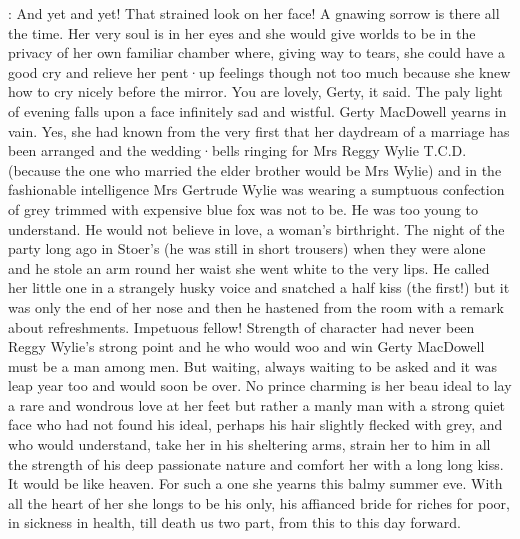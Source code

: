 :
And yet and yet!
That strained look on her face!
A gnawing sorrow is there all the time.
Her very soul is in her eyes
and she would give worlds
to be in the privacy of her own familiar chamber
where,
giving way to tears,
she could have a good cry
and relieve her pent·up feelings
though not too much
because she knew how to cry nicely before the mirror.
You are lovely,
Gerty,
it said.
The paly light of evening
falls upon a face infinitely sad and wistful.
Gerty MacDowell yearns in vain.
Yes,
she had known from the very first
that her daydream of a marriage
has been arranged
and the wedding·bells ringing
for Mrs Reggy Wylie T.C.D.
(because the one who married the elder brother
would be Mrs Wylie)
and in the fashionable intelligence
Mrs Gertrude Wylie was wearing a sumptuous confection of grey
trimmed with expensive blue fox
was not to be.
He was too young to understand.
He would not believe in love,
a woman's birthright.
The night of the party
long ago in Stoer's
(he was still in short trousers)
when they were alone
and he stole an arm round her waist
she went white
to the very lips.
He called her little one
in a strangely husky voice
and snatched a half kiss
(the first!)
but it was only the end of her nose
and then he hastened from the room
with a remark about refreshments.
Impetuous fellow!
Strength of character
had never been Reggy Wylie's strong point
and he who would woo and win Gerty MacDowell
must be a man among men.
But waiting,
always waiting
to be asked
and it was leap year too
and would soon be over.
No prince charming is her beau ideal
to lay a rare and wondrous love at her feet
but rather a manly man
with a strong quiet face
who had not found his ideal,
perhaps his hair slightly flecked with grey,
and who would understand,
take her in his sheltering arms,
strain her to him
in all the strength of his deep passionate nature
and comfort her
with a long long kiss.
It would be like heaven.
For such a one
she yearns this balmy summer eve.
With all the heart of her
she longs to be his only,
his affianced bride
for riches
for poor,
in sickness
in health,
till death us two part,
from this
to this day forward.

